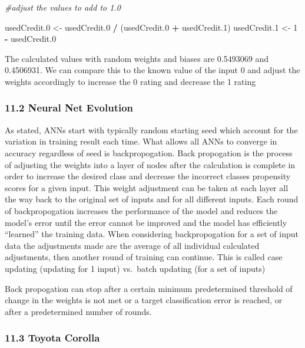 \documentclass[]{article}
\newenvironment{Shaded}{\begin{snugshade}}{\end{snugshade}}
\newcommand{\DecValTok}[1]{\textcolor[rgb]{0.00,0.00,0.81}{#1}}
\newcommand{\StringTok}[1]{\textcolor[rgb]{0.31,0.60,0.02}{#1}}
\newcommand{\CommentTok}[1]{\textcolor[rgb]{0.56,0.35,0.01}{\textit{#1}}}
\newcommand{\OperatorTok}[1]{\textcolor[rgb]{0.81,0.36,0.00}{\textbf{#1}}}
\newcommand{\NormalTok}[1]{#1}
\begin{document}
\begin{Shaded}
\begin{Highlighting}[]
\CommentTok{#adjust the values to add to 1.0}

\NormalTok{usedCredit.}\DecValTok{0}\NormalTok{ <-}\StringTok{ }\NormalTok{usedCredit.}\DecValTok{0} \OperatorTok{/}\StringTok{ }\NormalTok{(usedCredit.}\DecValTok{0} \OperatorTok{+}\StringTok{ }\NormalTok{usedCredit.}\DecValTok{1}\NormalTok{)}
\NormalTok{usedCredit.}\DecValTok{1}\NormalTok{ <-}\StringTok{ }\DecValTok{1} \OperatorTok{-}\StringTok{ }\NormalTok{usedCredit.}\DecValTok{0}
\end{Highlighting}
\end{Shaded}

The calculated values with random weights and biases are 0.5493069 and
0.4506931. We can compare this to the known value of the input 0 and
adjust the weights accordingly to increase the 0 rating and decrease the
1 rating

\subsubsection{11.2 Neural Net Evolution}\label{neural-net-evolution}

As stated, ANNs start with typically random starting seed which account
for the variation in training result each time. What allows all ANNs to
converge in accuracy regardless of seed is backpropogation. Back
propogation is the process of adjusting the weights into a layer of
nodes after the calculation is complete in order to increase the desired
class and decrease the incorrect classes propensity scores for a given
input. This weight adjustment can be taken at each layer all the way
back to the original set of inputs and for all different inputs. Each
round of backpropogation increases the performance of the model and
reduces the model's error until the error cannot be improved and the
model has efficiently ``learned'' the training data. When considering
backpropogation for a set of input data the adjustments made are the
average of all individual calculated adjustments, then another round of
training can continue. This is called case updating (updating for 1
input) vs.~batch updating (for a set of inputs)

Back propogation can stop after a certain minimum predetermined
threshold of change in the weights is not met or a target classification
error is reached, or after a predetermined number of rounds.

\subsubsection{11.3 Toyota Corolla}\label{toyota-corolla}
\end{document}
